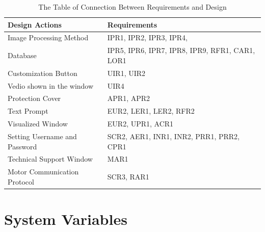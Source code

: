 \documentclass[12pt, titlepage]{article}
\begin{document}
\begin{table}[H]
\begin{center}
\caption {The Table of Connection Between Requirements and Design}
    \begin{tabular}{| p{8cm}| p{7cm} |}
    \hline
    \textbf{Design Actions} & \textbf{Requirements}  \\
    \hline
    Image Processing Method & IPR1, IPR2, IPR3, IPR4,  \\
    \hline
    Database  & IPR5, IPR6, IPR7, IPR8, IPR9, RFR1, CAR1, LOR1\\
    \hline
    Customization Button & UIR1, UIR2\\
    \hline
    Vedio shown in the window & UIR4\\
    \hline
    Protection Cover & APR1, APR2 \\
    \hline
    Text Prompt & EUR2, LER1, LER2, RFR2\\
    \hline
    Visualized Window & EUR2, UPR1, ACR1\\
    \hline
    Setting Username and Password & SCR2, AER1, INR1, INR2, PRR1, PRR2, CPR1\\
    \hline
    Technical Support Window & MAR1\\
    \hline
    Motor Communication Protocol & SCR3, RAR1\\
    \hline
    \end{tabular}
\end{center}
\end{table}

\section{System Variables}
\end{document}
